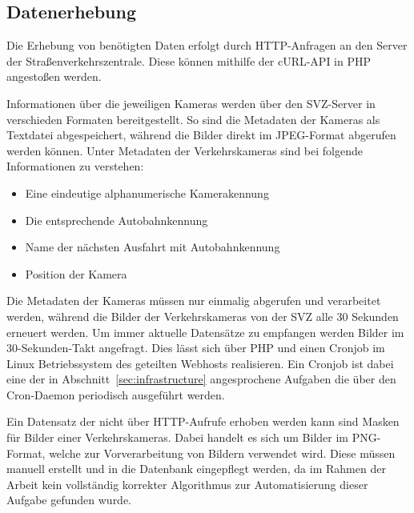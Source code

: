 \subsection{Datenerhebung}
\label{sec:datenerhebung}
Die Erhebung von benötigten Daten erfolgt durch HTTP-Anfragen an den Server der Straßenverkehrszentrale. Diese können mithilfe der cURL-API in PHP angestoßen werden.

Informationen über die jeweiligen Kameras werden über den SVZ-Server in verschieden Formaten bereitgestellt. So sind die Metadaten der Kameras als Textdatei abgespeichert, während die Bilder direkt im JPEG-Format abgerufen werden können. Unter Metadaten der Verkehrskameras sind bei folgende Informationen zu verstehen: 
\begin{itemize}
\item{Eine eindeutige alphanumerische Kamerakennung}
\item{Die entsprechende Autobahnkennung}
\item{Name der nächsten Ausfahrt mit Autobahnkennung}
\item{Position der Kamera}
\end{itemize}
Die Metadaten der Kameras müssen nur einmalig abgerufen und verarbeitet werden, während die Bilder der Verkehrskameras von der SVZ alle 30 Sekunden erneuert werden. 
Um immer aktuelle Datensätze zu empfangen werden Bilder im 30-Sekunden-Takt angefragt. 
Dies lässt sich über PHP und einen Cronjob im Linux Betriebssystem des geteilten Webhosts realisieren.
Ein Cronjob ist dabei eine der in Abschnitt~\ref{sec:infrastructure} angesprochene Aufgaben die über den Cron-Daemon periodisch ausgeführt werden.

Ein Datensatz der nicht über HTTP-Aufrufe erhoben werden kann sind Masken für Bilder einer Verkehrskameras.
Dabei handelt es sich um Bilder im PNG-Format, welche zur Vorverarbeitung von Bildern verwendet wird. Diese müssen manuell erstellt und in die Datenbank eingepflegt werden, da im Rahmen der Arbeit kein vollständig korrekter Algorithmus zur Automatisierung dieser Aufgabe gefunden wurde.
\newpage

